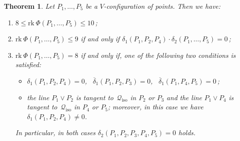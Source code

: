 \documentclass{amsart}
\theoremstyle{plain}
\newtheorem{theorem}[lemma]{Theorem}
\theoremstyle{definition}
\newcommand{\iso}{\mathcal{Q}_{\mathrm{iso}}}
\newcommand{\rk}{\ensuremath{\mathrm{rk}}}
\begin{document}
\begin{theorem}
\label{theorem:rank_V}
Let $P_1, \dots, P_5$ be a $V$-configuration of
points. Then we have:
\begin{enumerate}
\item $8 \leq \rk \ \Phi(P_1, \dots, P_5) \leq 10$\,;
\item $\rk \ \Phi(P_1, \dots, P_5) \leq 9$ if and only if
$\delta_1(P_1, P_2, P_4) \cdot \delta_2(P_1, \dots, P_5) =0$\,;
\item $\rk \ \Phi(P_1, \dots, P_5) = 8$ if and only if, one of
the following two conditions is satisfied:
%
\begin{itemize}
\item $\delta_1(P_1, P_2, P_4) = 0$, \
$\overline{\delta}_1(P_1, P_2, P_3) = 0$,
\ $\overline{\delta}_1(P_1, P_4, P_5) = 0$\,;
  \item the line $P_1 \vee P_2$ is tangent to~$\iso$ in $P_2$ or $P_3$
and the line $P_1 \vee P_4$ is tangent to~$\iso$ in $P_4$ or $P_5$; moreover, in this case we have $\delta_1(P_1, P_2, P_4) \neq 0$.
\end{itemize}
%
In particular, in both cases $\delta_2(P_1, P_2, P_3, P_4, P_5) = 0$ holds.
\end{enumerate}
\end{theorem}
\end{document}

